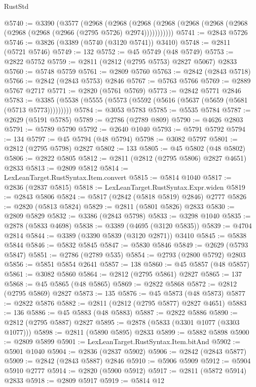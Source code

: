 \begin{lexlean}{RustStd}
\begin{coremodule}
{\begin{coremodule}
{{{{{{{{{{{{{{{{{{{{{{{{{{{{{{{{{@5740 := @3390
    (@3577
      (@2968
        (@2968
          (@2968 (@2968 (@2968 (@2968 (@2968 (@2968 (@2968 (@2966 (@2795 @5726) @2974)))))))))))
@5741 := @2843 @5726
@5746 := @3826 (@3389 (@5740 (@3120 @5741)) @3410)
@5748 := @2811 (@5721 @5746)
@5749 := 132
@5752 := @45 @5749 (@48 @5749)
@5753 := @2822 @5752
@5759 := @2811 (@2812 (@2795 @5753) @2827 @5067) @2833
@5760 := @5748 @5759
@5761 := @2809 @5760
@5763 := @2842 (@2843 @5718)
@5766 := @2842 (@2843 @5753) @2846
@5767 := @5763 @5766
@5769 := @2889 @5767 @2717
@5771 := @2820 (@5761 @5769)
@5773 := @2842 @5771 @2846
@5783 := @3385 (@5538 (@5555 (@5573 (@5592 (@5616 (@5637 (@5659 (@5681 (@5713 @5773)))))))))
@5784 := @3053 @5783
@5785 := @5535 @5784
@5787 := @2629 (@5191 @5785)
@5789 := @2786 (@2789 @809)
@5790 := @4626 @2803
@5791 := @5789 @5790
@5792 := @2640 @1040
@5793 := @5791 @5792
@5794 := 134
@5797 := @45 @5794 (@48 @5794)
@5798 := @3082 @5797
@5801 := @2812 (@2795 @5798) @2827
@5802 := 133
@5805 := @45 @5802 (@48 @5802)
@5806 := @2822 @5805
@5812 := @2811 (@2812 (@2795 @5806) @2827 @4651) @2833
@5813 := @2809 @5812
@5814 := LexLeanTarget.RustSyntax.Item.convert
@5815 := @5814 @1040
@5817 := @2836 (@2837 @5815)
@5818 := LexLeanTarget.RustSyntax.Expr.widen
@5819 := @2843 @5806
@5824 := @5817 (@2842 (@5818 @5819) @2846) @2777
@5826 := @2820 (@5813 @5824)
@5829 := @2811 (@5801 @5826) @2833
@5830 := @2809 @5829
@5832 := @3386 (@2843 @5798)
@5833 := @3298 @1040
@5835 := @2878 (@5833 @4698)
@5838 := @3389 (@4695 (@3120 @5835))
@5839 := @4704 @2814
@5844 := @3389 (@3390 @5839 (@3120 @2871)) @3410
@5845 := @5838 @5844
@5846 := @5832 @5845
@5847 := @5830 @5846
@5849 := @2629 (@5793 @5847)
@5851 := @2786 (@2789 @535)
@5854 := @2793 (@2800 @5792) @2803
@5856 := @5851 @5854 @2641
@5857 := 138
@5860 := @45 @5857 (@48 @5857)
@5861 := @3082 @5860
@5864 := @2812 (@2795 @5861) @2827
@5865 := 137
@5868 := @45 @5865 (@48 @5865)
@5869 := @2822 @5868
@5872 := @2812 (@2795 @5869) @2827
@5873 := 135
@5876 := @45 @5873 (@48 @5873)
@5877 := @2822 @5876
@5882 := @2811 (@2812 (@2795 @5877) @2827 @4651)
@5883 := 136
@5886 := @45 @5883 (@48 @5883)
@5887 := @2822 @5886
@5890 := @2812 (@2795 @5887) @2827
@5895 := @2878 (@5833 (@3301 @1077 (@3303 @1077)))
@5898 := @2811 (@5890 @5895) @2833
@5899 := @5882 @5898
@5900 := @2809 @5899
@5901 := LexLeanTarget.RustSyntax.Item.bitAnd
@5902 := @5901 @1040
@5904 := @2836 (@2837 @5902)
@5906 := @2842 (@2843 @5877)
@5909 := @2842 (@2843 @5887) @2846
@5910 := @5906 @5909
@5912 := @5904 @5910 @2777
@5914 := @2820 (@5900 @5912)
@5917 := @2811 (@5872 @5914) @2833
@5918 := @2809 @5917
@5919 := @5814 @12
}}}}}}}}}}}}}}}}}}}}}}}}}}}}}}}}}
\end{coremodule}}
\end{coremodule}
\end{lexlean}
